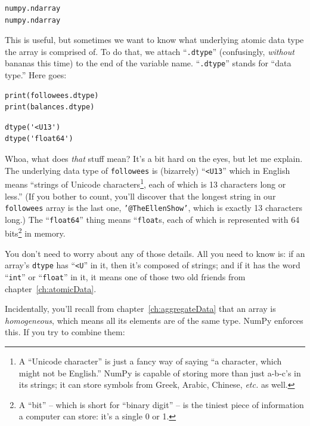 \begin{Verbatim}[fontsize=\small,samepage=true,frame=leftline,framesep=5mm,framerule=1mm]
numpy.ndarray
numpy.ndarray
\end{Verbatim}

This is useful, but sometimes we want to know what underlying atomic data type
the array is comprised of. To do that, we attach ``\texttt{.dtype}''
(confusingly, \textit{without} bananas this time) to the end of the variable
name. ``\texttt{.dtype}'' stands for ``data type.'' Here goes:

\begin{Verbatim}[fontsize=\small,samepage=true,frame=single,framesep=3mm]
print(followees.dtype)
print(balances.dtype)
\end{Verbatim}

\begin{Verbatim}[fontsize=\small,samepage=true,frame=leftline,framesep=5mm,framerule=1mm]
dtype('<U13')
dtype('float64')
\end{Verbatim}

Whoa, what does \textit{that} stuff mean? It's a bit hard on the eyes, but let
me explain. The underlying data type of \texttt{followees} is (bizarrely)
``\texttt{<U13}'' which in English means ``strings of Unicode
characters\footnote{A ``Unicode character'' is just a fancy way of saying ``a
character, which might not be English.'' NumPy is capable of storing more than
just a-b-c's in its strings; it can store symbols from Greek, Arabic, Chinese,
\textit{etc.} as well.}, each of which is 13 characters long or less.'' (If you
bother to count, you'll discover that the longest string in our
\texttt{followees} array is the last one, \texttt{'@TheEllenShow'}, which is
exactly 13 characters long.) The ``\texttt{float64}'' thing means
``\texttt{float}s, each of which is represented with 64 bits\footnote{A ``bit''
-- which is short for ``binary digit'' -- is the tiniest piece of information a
computer can store: it's a single 0 or 1.} in memory.

You don't need to worry about any of those details. All you need to know is: if
an array's \texttt{dtype} has ``\texttt{<U}'' in it, then it's composed of
strings; and if it has the word ``\texttt{int}'' or ``\texttt{float}'' in it,
it means one of those two old friends from chapter~\ref{ch:atomicData}.

Incidentally, you'll recall from chapter~\ref{ch:aggregateData} that an array
is \textit{homogeneous}, which means all its elements are of the same type.
NumPy enforces this. If you try to combine them:


